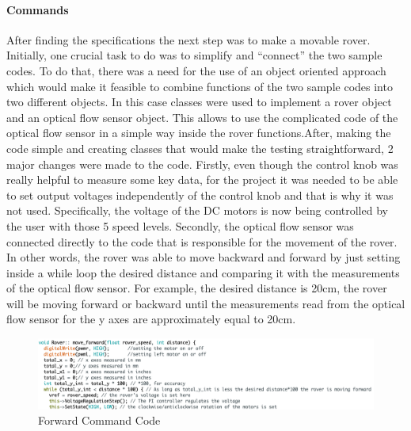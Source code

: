\documentclass[a4paper]{article}
\begin{document}
\paragraph*{Commands}


After finding the specifications the next step was to make a movable rover. 
Initially, one crucial task to do was to simplify and ``connect''  the two 
sample codes. To do that, there was a need for the use of an object oriented 
approach which would make it feasible to combine functions of the two sample 
codes into two different objects. In this case classes were used to implement 
a rover object and an optical flow sensor object. This allows to use the 
complicated code of the optical flow sensor in a simple way inside the rover 
functions.After, making the code simple and creating classes that would make 
the testing straightforward, 2 major changes were made to the code. Firstly, 
even though the control knob was really helpful to measure some key data, 
for the project it was needed to be able to set output voltages independently 
of the control knob and that is why it was not used. Specifically, the voltage 
of the DC motors is now being controlled by the user with those 5 speed levels. 
Secondly, the optical flow sensor was connected directly to the code that is 
responsible for the movement of the rover. In other words, the rover was able 
to move backward and forward by just setting inside a while loop the desired 
distance and comparing it with the measurements of the optical flow sensor. 
For example, the desired distance is 20cm, the rover will be moving forward 
or backward until the measurements read from the optical flow sensor for the 
y axes are approximately equal to 20cm.

\begin{figure}[H]
	\begin{Center}
		\includegraphics[scale=0.3]{./media/forward.png}
		\caption{Forward Command Code}
	\end{Center}
\end{figure}
\end{document}
